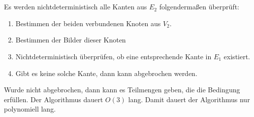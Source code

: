\documentclass[10pt,a4paper,oneside,ngerman,numbers=noenddot]{scrartcl}
\begin{document}
\section{} %
\subsection{} %
Es werden nichtdeterministisch alle Kanten aus $E_{2}$ folgendermaßen überprüft:\\
\begin{enumerate}
	\item Bestimmen der beiden verbundenen Knoten aus $V_{2}$.
	\item Bestimmen der Bilder dieser Knoten
	\item Nichtdeterministisch überprüfen, ob eine entsprechende Kante in $E_{1}$ existiert.
	\item Gibt es keine solche Kante, dann kann abgebrochen werden.
\end{enumerate}
Wurde nicht abgebrochen, dann kann es Teilmengen geben, die die Bedingung erfüllen.
Der Algorithmus dauert $O(3)$ lang. Damit dauert der Algorithmus nur polynomiell lang.
\subsection{} %
\end{document}
